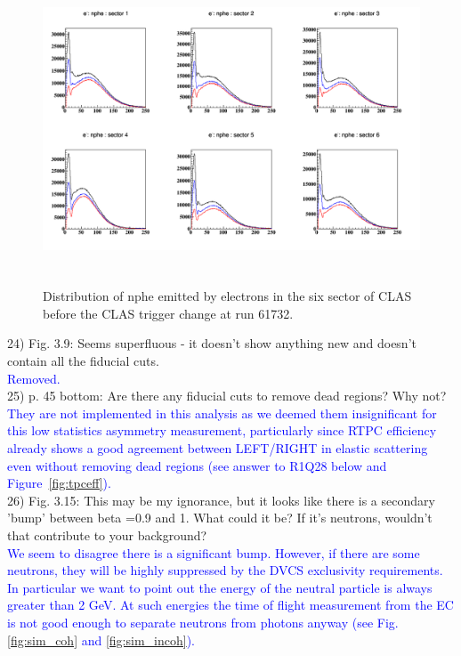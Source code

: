 \begin{figure}[tbp]
\centering
\includegraphics[height=9.2cm]{fig/nphe_1_sectors.png}
\caption{Distribution of nphe emitted by electrons in the six sector of CLAS 
before the CLAS trigger change at run 61732.}
\label{fig:nphe_1}
\end{figure}

24) Fig. 3.9: Seems superfluous - it doesn't show anything new and doesn't 
contain all the fiducial cuts.\\
 \textcolor{blue}{Removed.}\\

25) p. 45 bottom: Are there any fiducial cuts to remove dead regions? Why 
not?\\
\textcolor{blue}{They are not implemented in this analysis as we deemed them
insignificant for this low statistics asymmetry measurement, particularly since
RTPC efficiency already shows a good agreement between LEFT/RIGHT in elastic scattering even
without removing dead regions (see answer to R1Q28 below and Figure~\ref{fig:tpceff}).}\\

26) Fig. 3.15: This may be my ignorance, but it looks like there is a 
secondary 'bump' between beta =0.9 and 1. What could it be? If it's neutrons, 
wouldn't that contribute to your background?\\
\textcolor{blue}{We seem to disagree there is a significant bump. However, if 
   there are some neutrons, they will be highly suppressed by the DVCS
   exclusivity requirements. In particular we want to point out the energy of the 
   neutral particle is always greater than 2 GeV. At such energies the time 
   of flight measurement from the EC is not good enough to separate neutrons 
   from photons anyway (see Fig. \ref{fig:sim_coh} and \ref{fig:sim_incoh}).}\\


